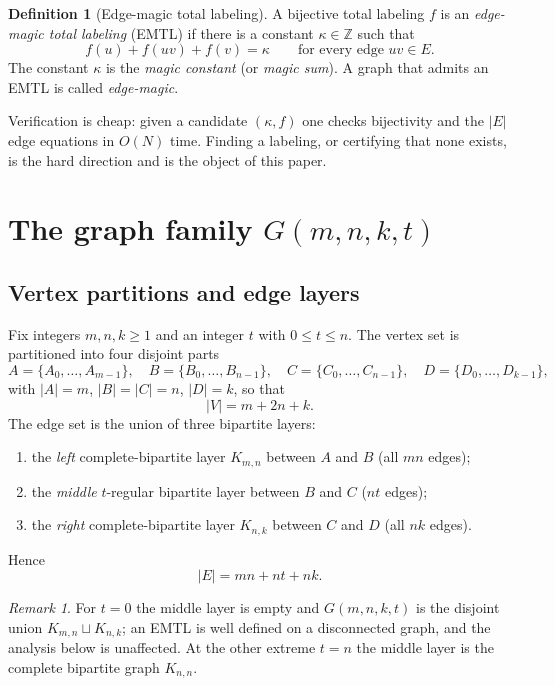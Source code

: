 \documentclass[11pt,a4paper]{article}
\theoremstyle{plain}
\theoremstyle{definition}
\newtheorem{definition}{Definition}
\theoremstyle{remark}
\newtheorem*{remark}{Remark}
\newcommand{\Z}{\mathbb{Z}}
\newcommand{\km}{\kappa}
\newcommand{\Gfam}{G(m,n,k,t)}
\begin{document}
\begin{definition}[Edge-magic total labeling]\label{def:emtl}
A bijective total labeling $f$ is an \emph{edge-magic total labeling} (EMTL) if there
is a constant $\km\in\Z$ such that
\[
  f(u)+f(uv)+f(v)=\km \qquad\text{for every edge } uv\in E .
\]
The constant $\km$ is the \emph{magic constant} (or \emph{magic sum}). A graph that
admits an EMTL is called \emph{edge-magic}.
\end{definition}

Verification is cheap: given a candidate $(\km,f)$ one checks bijectivity and the
$|E|$ edge equations in $O(N)$ time. Finding a labeling, or certifying that none
exists, is the hard direction and is the object of this paper.

\section{The graph family \texorpdfstring{$G(m,n,k,t)$}{G(m,n,k,t)}}\label{sec:family}

\subsection{Vertex partitions and edge layers}

Fix integers $m,n,k\ge 1$ and an integer $t$ with $0\le t\le n$. The vertex set is
partitioned into four disjoint parts
\[
  A=\{A_0,\dots,A_{m-1}\},\quad
  B=\{B_0,\dots,B_{n-1}\},\quad
  C=\{C_0,\dots,C_{n-1}\},\quad
  D=\{D_0,\dots,D_{k-1}\},
\]
with $|A|=m$, $|B|=|C|=n$, $|D|=k$, so that
\begin{equation}\label{eq:Vcount}
  |V| = m + 2n + k .
\end{equation}
The edge set is the union of three bipartite layers:
\begin{enumerate}[label=(\arabic*),itemsep=1pt]
  \item the \emph{left} complete-bipartite layer $K_{m,n}$ between $A$ and $B$
        (all $mn$ edges);
  \item the \emph{middle} $t$-regular bipartite layer between $B$ and $C$ ($nt$ edges);
  \item the \emph{right} complete-bipartite layer $K_{n,k}$ between $C$ and $D$
        (all $nk$ edges).
\end{enumerate}
Hence
\begin{equation}\label{eq:Ecount}
  |E| = mn + nt + nk .
\end{equation}

\begin{remark}\label{rem:boundary}
For $t=0$ the middle layer is empty and $\Gfam$ is the disjoint union
$K_{m,n}\sqcup K_{n,k}$; an EMTL is well defined on a disconnected graph, and the
analysis below is unaffected. At the other extreme $t=n$ the middle layer is the
complete bipartite graph $K_{n,n}$.
\end{remark}
\end{document}
